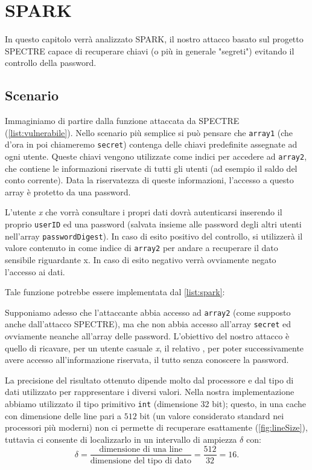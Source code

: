 \chapter{SPARK}
	In questo capitolo verrà analizzato \ac{SPARK}, il nostro attacco basato sul progetto SPECTRE capace di recuperare chiavi (o più in generale "segreti") evitando il controllo della password.
	
	\section{Scenario}
		Immaginiamo di partire dalla funzione attaccata da SPECTRE (\cref{list:vulnerabile}). Nello scenario più semplice si può pensare che \texttt{array1} (che d'ora in poi chiameremo \texttt{secret}) contenga delle chiavi predefinite assegnate ad ogni utente. Queste chiavi vengono utilizzate come indici  per accedere ad \texttt{array2}, che contiene le informazioni riservate di tutti gli utenti (ad esempio il saldo del conto corrente). Data la riservatezza di queste informazioni, l'accesso a questo array è protetto da una password. 
		
		L'utente \emph{x} che vorrà consultare i propri dati dovrà autenticarsi inserendo il proprio \texttt{userID} ed una password (salvata insieme alle password degli altri utenti nell'array \texttt{passwordDigest}). In caso di esito positivo del controllo, si utilizzerà il valore contenuto in  come indice di \texttt{array2} per andare a recuperare il dato sensibile riguardante x. In caso di esito negativo verrà ovviamente negato l'accesso ai dati.
		
		Tale funzione potrebbe essere implementata dal \cref{list:spark}:
		
		Supponiamo adesso che l'attaccante abbia accesso ad \texttt{array2} (come supposto anche dall'attacco SPECTRE), ma che non abbia accesso all'array \texttt{secret} ed ovviamente neanche all'array delle password. L'obiettivo del nostro attacco è quello di ricavare, per un utente casuale \emph{x}, il relativo , per poter successivamente avere accesso all'informazione riservata, il tutto senza conoscere la password.
		
		La precisione del risultato ottenuto dipende molto dal processore e dal tipo di dati utilizzato per rappresentare i diversi valori. Nella nostra implementazione abbiamo utilizzato il tipo primitivo \texttt{int} (dimensione 32 bit); questo, in una cache con dimensione delle line pari a $512$ bit (un valore considerato standard nei processori più moderni) non ci permette di recuperare esattamente  (\cref{fig:lineSize}), tuttavia ci consente di localizzarlo in un intervallo di ampiezza $\delta$ con: $$\delta = \frac{\text{dimensione di una line}}{\text{dimensione del tipo di dato}} = \frac{512}{32} = 16.$$
		
